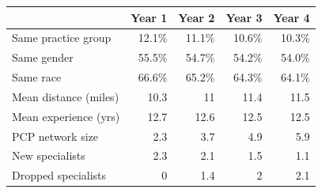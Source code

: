 
\begin{tabular}{lrrrr}
\toprule
  & Year 1 & Year 2 & Year 3 & Year 4\\
\midrule
Same practice group & 12.1\% & 11.1\% & 10.6\% & 10.3\%\\
Same gender & 55.5\% & 54.7\% & 54.2\% & 54.0\%\\
Same race & 66.6\% & 65.2\% & 64.3\% & 64.1\%\\
Mean distance (miles) & 10.3 & 11 & 11.4 & 11.5\\
Mean experience (yrs) & 12.7 & 12.6 & 12.5 & 12.5\\
PCP network size & 2.3 & 3.7 & 4.9 & 5.9\\
New specialists & 2.3 & 2.1 & 1.5 & 1.1\\
Dropped specialists & 0 & 1.4 & 2 & 2.1\\
\bottomrule
\end{tabular}

